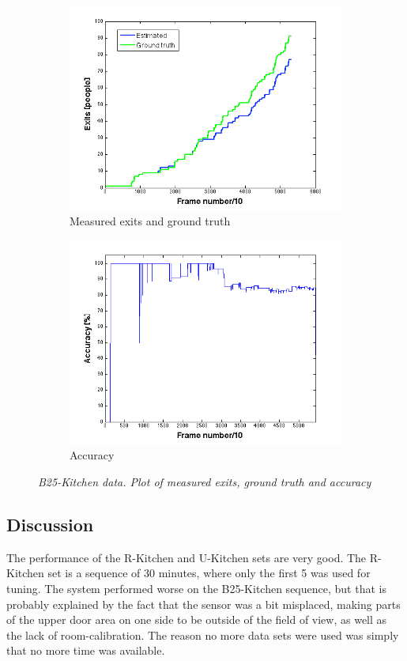 \begin{figure}[H]
\centering
\begin{subfigure}{.5\textwidth}
  \centering
  \includegraphics[width=1.1\linewidth]{images/ExitsEval.png}
  \caption{Measured exits and ground truth}
  \label{fig:sub1}
\end{subfigure}%
\begin{subfigure}{.5\textwidth}
  \centering
  \includegraphics[width=1.1\linewidth]{images/AccExitsEval.png}
  \caption{Accuracy}
  \label{fig:sub2}
\end{subfigure}
\caption[Entries evaluation]{\textit{B25-Kitchen data. Plot of measured exits, ground truth and accuracy}}
\label{fig:Exits evaluation}
\end{figure}

\subsection{Discussion}
The performance of the R-Kitchen and U-Kitchen sets are very good. The R-Kitchen set is a sequence of 30 minutes, where only the first 5 was used for tuning. The system performed worse on the B25-Kitchen sequence, but that is probably explained by the fact that the sensor was a bit misplaced, making parts of the upper door area on one side to be outside of the field of view, as well as the lack of room-calibration. The reason no more data sets were used was simply that no more time was available.


